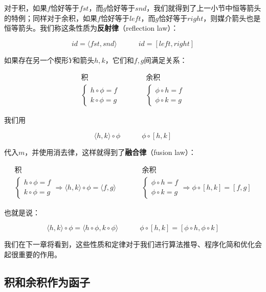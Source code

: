 \documentclass{article}
\begin{document}
对于积，如果$f$恰好等于$fst$，而$g$恰好等于$snd$，我们就得到了上一小节中恒等箭头的特例；同样对于余积，如果$f$恰好等于$left$，而$g$恰好等于$right$，则媒介箭头也是恒等箭头。我们称这条性质为\textbf{反射律}（reflection law）：

\[
id = \langle fst, snd \rangle \quad \quad \quad id = [left, right]
\]

如果存在另一个楔形$Y$和箭头$h, k$，它们和$f, g$间满足关系：

\[
\begin{array}{ccc}
  \text{积} & & \text{余积} \\
  \begin{cases}
  h \circ \phi = f \\
  k \circ \phi = g
  \end{cases}
  & \quad \quad &
  \begin{cases}
  \phi \circ h = f \\
  \phi \circ k = g
  \end{cases}
\end{array}
\]

我们用

\[
\langle h, k \rangle \circ \phi \quad \quad \quad \phi \circ [h, k]
\]

代入$m$，并使用消去律，这样就得到了\textbf{融合律}（fusion law）：

\[
\begin{array}{ccc}
  \text{积} & & \text{余积} \\
  \begin{cases}
  h \circ \phi = f \\
  k \circ \phi = g
  \end{cases} \Rightarrow
    \langle h, k \rangle \circ \phi = \langle f, g \rangle
  & \quad \quad &
  \begin{cases}
  \phi \circ h = f \\
  \phi \circ k = g
  \end{cases} \Rightarrow
    \phi \circ [h, k] = [f, g]
\end{array}
\]

也就是说：

\[
\langle h, k \rangle \circ \phi = \langle h \circ \phi, k \circ \phi \rangle
\quad \quad \quad
\phi \circ [h, k] = [\phi \circ h, \phi \circ k]
\]

我们在下一章将看到，这些性质和定律对于我们进行算法推导、程序化简和优化会起很重要的作用。

\subsection{积和余积作为函子}
\end{document}
